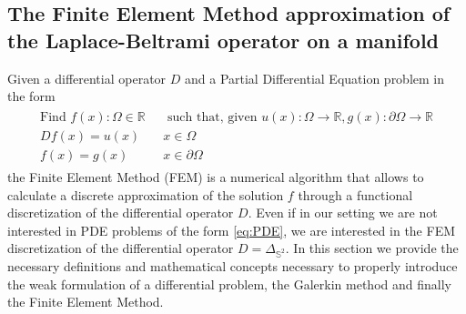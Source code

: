\subsection{The Finite Element Method approximation of the Laplace-Beltrami operator on a manifold}\label{sec:Chapter3: Using the Finite Element Method to approximate the Laplace-Beltrami operator on a manifold}
Given a differential operator $D$ and a Partial Differential Equation problem in the form
\begin{align}\label{eq:PDE}
\begin{split}
\text{Find } f(x):\Omega\in\mathbb R &\text{ such that, given }u(x):\Omega\to\mathbb R, g(x):\partial\Omega\to\mathbb R\\
Df(x)=u(x)\quad&x\in\Omega\\
f(x)=g(x)\quad &x\in\partial\Omega
\end{split}
\end{align}
the Finite Element Method (FEM) is a numerical algorithm that allows to calculate a discrete approximation of the solution $f$ through a functional discretization of the differential operator $D$. Even if in our setting we are not interested in PDE problems of the form \ref{eq:PDE}, we are interested in the FEM discretization of the differential operator $D=\Delta_{\mathbb S^2}$. In this section we provide the necessary definitions and mathematical concepts necessary to properly introduce the weak formulation of a differential problem, the Galerkin method and finally the Finite Element Method.\\
